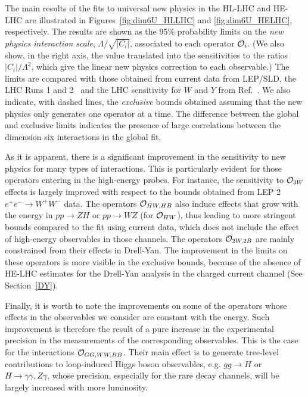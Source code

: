 The main results of the fits to universal new physics in the HL-LHC and HE-LHC are illustrated in Figures~\ref{fig:dim6U_HLLHC} and \ref{fig:dim6U_HELHC}, respectively.
The results are shown as the 95\% probability limits on the {\it new physics interaction scale}, $\Lambda/\sqrt{\vert C_i\vert }$, associated to each operator ${\cal O}_i$. (We also show, in the right axis, the value translated into the sensitivities to the ratios $\vert C_i\vert /\Lambda^2$, which give the linear new physics correction to each observable.)
The limits are compared with those obtained from current data from LEP/SLD, the LHC Runs 1 and 2~\cite{deBlas:2016ojx,deBlas:2016nqo,deBlas:2017wmn,hepfit:2019} and the LHC sensitivity for $W$ and $Y$ from Ref.~\cite{Farina:2016rws}. We also indicate, with dashed lines, the {\it exclusive} bounds obtained assuming that the new physics only generates one operator at a time. The difference between the global and exclusive limits indicates the presence of large correlations between the dimension six interactions in the global fit.

As it is apparent, there is a significant improvement in the sensitivity to new physics for many types of interactions. This is particularly evident for those operators entering in the high-energy probes. For instance, the sensitivity to ${\cal O}_{3W}$ effects is largely improved with respect to the bounds obtained from LEP 2 $e^+ e^- \to W^+ W^-$ data. The operators ${\cal O}_{HW,HB}$ also induce effects that grow with the energy in $pp\to ZH$ or $pp\to WZ$ (for ${\cal O}_{HW}$), thus leading to more stringent bounds compared to the fit using current data, which does not include the effect of high-energy observables in those channels. The operators ${\cal O}_{2W,2B}$ are mainly constrained from their effects in Drell-Yan. The improvement in the limits on these operators is more visible in the exclusive bounds, because of the absence of HE-LHC estimates for the Drell-Yan analysis in the charged current channel (See Section~\ref{DY}).

Finally, it is worth to note the improvements on some of the operators whose effects in the observables we consider are constant with the energy.  Such improvement is therefore the result of a pure increase in the experimental precision in the measurements of the corresponding observables. This is the case for the interactions ${\cal O}_{GG,WW,BB}$. Their main effect is to generate tree-level contributions to loop-induced Higgs boson observables, e.g. $gg\to H$ or $H\to \gamma\gamma, Z\gamma$, whose precision, especially for the rare decay channels, will be largely increased with more luminosity.

